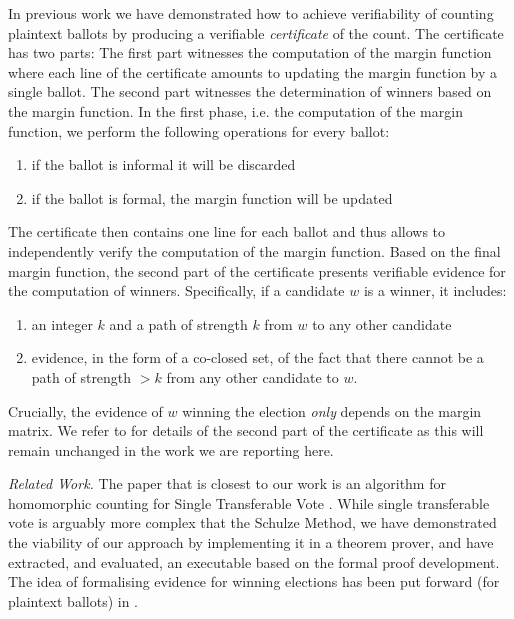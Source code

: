 \documentclass{llncs}
\begin{document}
  In previous work \cite{Pattinson:2017:SVE} we have demonstrated
  how to achieve verifiability of counting plaintext ballots by
  producing a verifiable \emph{certificate} of the count. The
  certificate has two parts: The first part witnesses the
  computation of the margin function where each line of the
  certificate amounts to updating the margin function by a single
  ballot. The second part witnesses the determination of winners
  based on the margin function. In the first phase, i.e. the
  computation of the margin function, we perform the following
  operations for every ballot:
  \begin{enumerate}
    \item if the ballot is informal it will be discarded
    \item if the ballot is formal, the margin function will be
    updated
  \end{enumerate}
  The certificate then contains one line for each ballot and thus
  allows to independently verify the computation of the margin
  function. Based on the final margin function, the second part of
  the certificate presents verifiable evidence for the computation
  of winners. Specifically, if a candidate $w$ is a winner, it
  includes:
  \begin{enumerate}
    \item an integer $k$ and a path of strength $k$ from $w$ to any
    other candidate
    \item evidence, in the form of a co-closed set, of the fact that
    there cannot be a path of strength $> k$ from any other
    candidate to $w$.
  \end{enumerate}
  Crucially, the evidence of $w$ winning the election \emph{only}
  depends on the margin matrix. 
  We refer to \cite{Pattinson:2017:SVE} for details of the second
  part of the certificate as this will remain unchanged in the work
  we are reporting here.
    
   
\noindent\smallskip\emph{Related Work.} The paper that is closest to
our work is an algorithm for homomorphic counting for Single
Transferable Vote \cite{Benaloh:2009:SSC}. While single transferable
vote is arguably more complex that the Schulze Method, we have
demonstrated the viability of our approach by implementing it in a
theorem prover, and have extracted, and evaluated, an executable
based on the formal proof development. The idea of formalising
evidence for winning elections has been put forward (for plaintext
ballots) in \cite{Pattinson:2015:VCM}. 
\end{document}
